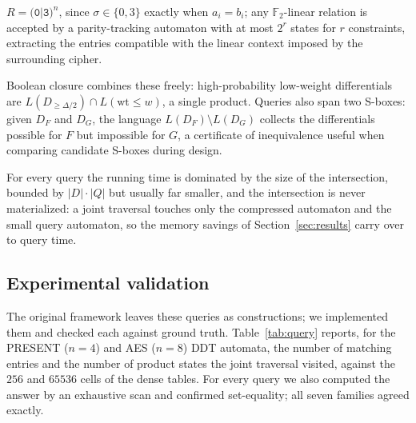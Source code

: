 \documentclass[runningheads]{llncs}
\newcommand{\F}{\mathbb{F}}
\newcommand{\re}[1]{\texttt{#1}}
\newcommand{\wt}{\mathrm{wt}}
\begin{document}
\begin{description}
  $R=\re{(0|3)}^{n}$, since $\sigma\in\{0,3\}$ exactly when $a_i=b_i$; any
  $\F_2$-linear relation is accepted by a parity-tracking automaton with at most
  $2^{r}$ states for $r$ constraints, extracting the entries compatible with the
  linear context imposed by the surrounding cipher.
\item[Composite and comparative queries.] Boolean closure combines these freely:
  high-probability low-weight differentials are
  $L(D_{\ge\Delta/2})\cap L(\wt\le w)$, a single product. Queries also span two
  S-boxes: given $D_F$ and $D_G$, the language $L(D_F)\setminus L(D_G)$ collects
  the differentials possible for $F$ but impossible for $G$, a certificate of
  inequivalence useful when comparing candidate S-boxes during design.
\end{description}

For every query the running time is dominated by the size of the intersection,
bounded by $|D|\cdot|Q|$ but usually far smaller, and the intersection is never
materialized: a joint traversal touches only the compressed automaton and the
small query automaton, so the memory savings of Section~\ref{sec:results} carry
over to query time.

\subsection{Experimental validation}
\label{sec:query-exp}

The original framework leaves these queries as constructions; we implemented them
and checked each against ground truth. Table~\ref{tab:query} reports, for the
PRESENT ($n=4$) and AES ($n=8$) DDT automata, the number of matching entries and
the number of product states the joint traversal visited, against the $256$ and
$65536$ cells of the dense tables. For every query we also computed the answer by
an exhaustive scan and confirmed set-equality; all seven families agreed exactly.
\end{document}
